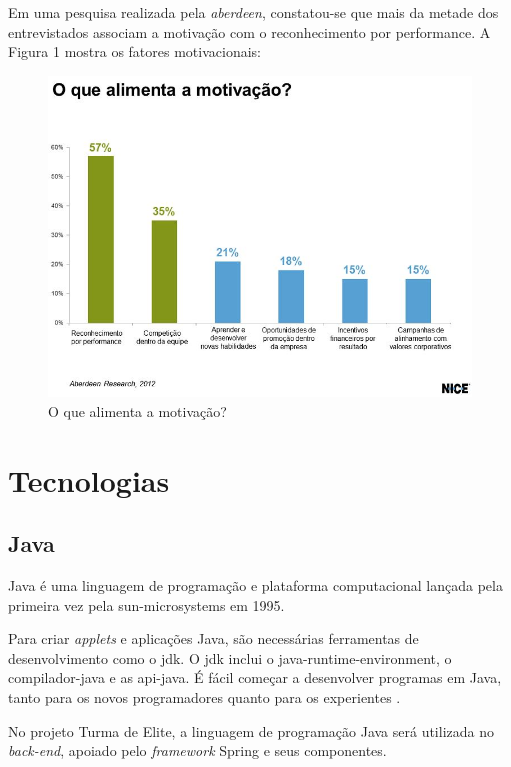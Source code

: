 Em uma pesquisa realizada pela \textit{\gls{aberdeen}}, constatou-se que mais da metade dos entrevistados associam a motivação com o reconhecimento por performance. A Figura 1 mostra os fatores motivacionais:

\begin{figure}[htb]
    \centering
	\includegraphics[width=16cm]{imagens/recompensa.jpg}
	\caption{O que alimenta a motivação?}
\end{figure}
\FloatBarrier

\section{Tecnologias}
\subsection{Java}
Java é uma linguagem de programação e plataforma computacional lançada pela primeira vez pela \gls{sun-microsystems} em 1995.


Para criar \textit{applets} e aplicações Java, são necessárias ferramentas de desenvolvimento como o {\ac{jdk}}. O {\ac{jdk}} inclui o \gls{java-runtime-environment}, o \gls{compilador-java} e as \gls{api-java}. É fácil começar a desenvolver programas em Java, tanto para os novos programadores quanto para os experientes \cite{java:2016}.


No projeto Turma de Elite, a linguagem de programação Java será utilizada no \textit{back-end}, apoiado pelo \textit{\gls{framework}} Spring e seus componentes.


